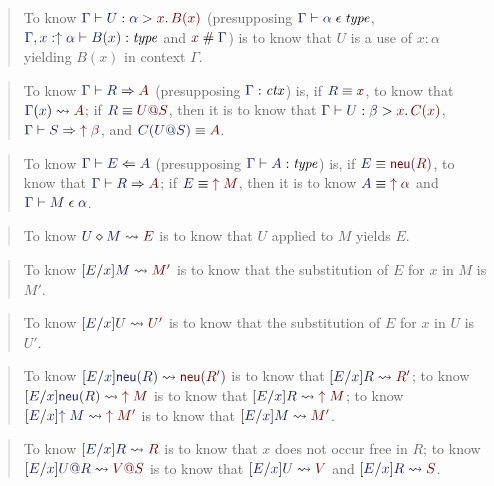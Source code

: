 \documentclass[main.tex]{subfiles}
\begin{document}
\begin{quote}
  To know $\lfsequent\Gamma\useof{U}{\alpha}{x}{B(x)}$ (presupposing
$\lfsequent\Gamma\cantype{\alpha}$, $\lfsequent{\Gamma,x:\ival\alpha}{\type{B(x)}}$ and
$\fresh{x}{\Gamma}$) is to know that $U$ is a use of $x:\alpha$ yielding
$B(x)$ in context $\Gamma$.
\end{quote}\medskip

\begin{quote}
  To know $\lfsequent\Gamma\infers{R}{A}$ (presupposing
$\lfctx\Gamma$) is, if $\match{R}{x}$, to know that
$\hasvar{\Gamma}{x}{A}$; if $\match{R}{\elim{U}{S}}$, then it is to
know that $\lfsequent\Gamma\useof{U}{\beta}{x}{C(x)}$,
$\lfsequent\Gamma\infers{S}{\ival\beta}$, and $\match{C(\elim{U}{S})}{A}$.
\end{quote}\medskip

\begin{quote}
  To know $\lfsequent\Gamma\checks{E}{A}$ (presupposing
$\lfsequent\Gamma\type{A}$) is, if $\match{E}{\ineu{R}}$, to know that
$\lfsequent\Gamma\infers{R}{A}$; if $\match{E}{\ival{M}}$, then it is to know
$\match{A}{\ival\alpha}$ and $\lfsequent\Gamma\valof{M}{\alpha}$.
\end{quote}\medskip

\begin{quote}
  To know $\eapply{U}{M}{E}$ is to know that $U$ applied
to $M$ yields $E$.
\end{quote}\medskip

\begin{quote}
  To know $\hsubste{E}{x}{M}{M'}$ is to know that the substitution of $E$ for $x$ in $M$ is $M'$.
\end{quote}\medskip

\begin{quote}
  To know $\hsubste{E}{x}{U}{U'}$ is to know that the substitution of $E$ for $x$ in $U$ is $U'$.
\end{quote}\medskip

\begin{quote}
  To know $\hsubste{E}{x}{\ineu{R}}{\ineu{R'}}$ is to know that
$\hsubstr{E}{x}{R}{R'}$; to know $\hsubste{E}{x}{\ineu{R}}{\ival{M}}$
is to know that $\hsubstrm{E}{x}{R}{\ival{M}}$; to know
$\hsubste{E}{x}{\ival{M}}{\ival{M'}}$ is to know that
$\hsubstm{E}{x}{M}{M'}$.
\end{quote}\medskip

\begin{quote}
  To know $\hsubstr{E}{x}{R}{R}$ is to know that $x$ does not occur
free in $R$; to know $\hsubstr{E}{x}{\elim{U}{R}}{\elim{V}{S}}$ is to
know that $\hsubstu{E}{x}{U}{V}$ and $\hsubstr{E}{x}{R}{S}$.
\end{quote}\medskip
\end{document}

